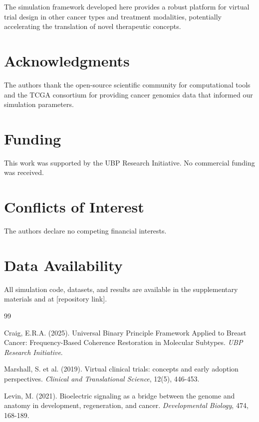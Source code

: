 \documentclass[12pt,a4paper]{article}
\begin{document}
The simulation framework developed here provides a robust platform for virtual trial design in other cancer types and treatment modalities, potentially accelerating the translation of novel therapeutic concepts.

\section*{Acknowledgments}

The authors thank the open-source scientific community for computational tools and the TCGA consortium for providing cancer genomics data that informed our simulation parameters.

\section*{Funding}

This work was supported by the UBP Research Initiative. No commercial funding was received.

\section*{Conflicts of Interest}

The authors declare no competing financial interests.

\section*{Data Availability}

All simulation code, datasets, and results are available in the supplementary materials and at [repository link].

\begin{thebibliography}{99}

Craig, E.R.A. (2025). Universal Binary Principle Framework Applied to Breast Cancer: Frequency-Based Coherence Restoration in Molecular Subtypes. \textit{UBP Research Initiative}.

Marshall, S. et al. (2019). Virtual clinical trials: concepts and early adoption perspectives. \textit{Clinical and Translational Science}, 12(5), 446-453.

Levin, M. (2021). Bioelectric signaling as a bridge between the genome and anatomy in development, regeneration, and cancer. \textit{Developmental Biology}, 474, 168-189.

\end{thebibliography}
\end{document}
